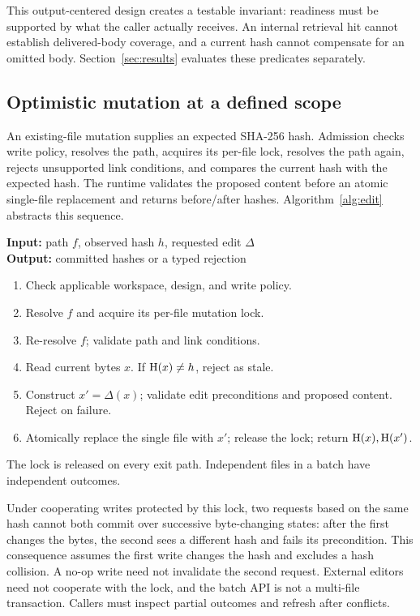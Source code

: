 This output-centered design creates a testable invariant: readiness must be supported by what the caller actually receives. An internal retrieval hit cannot establish delivered-body coverage, and a current hash cannot compensate for an omitted body. Section~\ref{sec:results} evaluates these predicates separately.

\subsection{Optimistic mutation at a defined scope}
An existing-file mutation supplies an expected SHA-256 hash. Admission checks write policy, resolves the path, acquires its per-file lock, resolves the path again, rejects unsupported link conditions, and compares the current hash with the expected hash. The runtime validates the proposed content before an atomic single-file replacement and returns before/after hashes. Algorithm~\ref{alg:edit} abstracts this sequence.

\begin{algorithm}[t]
\small
\caption{Guarded edit admission (contract abstraction)}
\label{alg:edit}
\textbf{Input:} path $f$, observed hash $h$, requested edit $\Delta$\\
\textbf{Output:} committed hashes or a typed rejection
\begin{enumerate}[label=\arabic*.,leftmargin=1.6em]
\item Check applicable workspace, design, and write policy.
\item Resolve $f$ and acquire its per-file mutation lock.
\item Re-resolve $f$; validate path and link conditions.
\item Read current bytes $x$. If $\operatorname{H}(x)\ne h$, reject as stale.
\item Construct $x'=\Delta(x)$; validate edit preconditions and proposed content. Reject on failure.
\item Atomically replace the single file with $x'$; release the lock; return $\operatorname{H}(x),\operatorname{H}(x')$.
\end{enumerate}
The lock is released on every exit path. Independent files in a batch have independent outcomes.
\end{algorithm}

Under cooperating writes protected by this lock, two requests based on the same hash cannot both commit over successive byte-changing states: after the first changes the bytes, the second sees a different hash and fails its precondition. This consequence assumes the first write changes the hash and excludes a hash collision. A no-op write need not invalidate the second request. External editors need not cooperate with the lock, and the batch API is not a multi-file transaction. Callers must inspect partial outcomes and refresh after conflicts.

